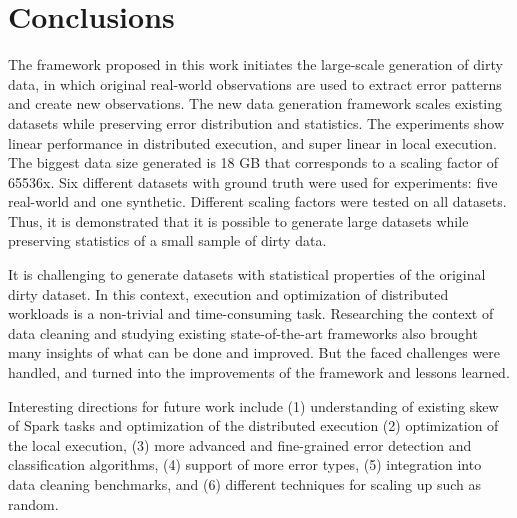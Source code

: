 \chapter{Conclusions}
The framework proposed in this work initiates the large-scale generation of dirty data, in which original real-world observations are used to extract error patterns and create new observations.
The new data generation framework scales existing datasets while preserving error distribution and statistics.
The experiments show linear performance in distributed execution, and super linear in local execution.
The biggest data size generated is 18 GB that corresponds to a scaling factor of 65536x.
Six different datasets with ground truth were used for experiments: five real-world and one synthetic.
Different scaling factors were tested on all datasets.
Thus, it is demonstrated that it is possible to generate large datasets while preserving statistics of a small sample of dirty data.

It is challenging to generate datasets with statistical properties of the original dirty dataset.
In this context, execution and optimization of distributed workloads is a non-trivial and time-consuming task.
Researching the context of data cleaning and studying existing state-of-the-art frameworks also brought many insights of what can be done and improved.
But the faced challenges were handled, and turned into the improvements of the framework and lessons learned.

Interesting directions for future work include 
(1) understanding of existing skew of Spark tasks and optimization of the distributed execution
(2) optimization of the local execution, 
(3) more advanced and fine-grained error detection and classification algorithms,
(4) support of more error types, 
(5) integration into data cleaning benchmarks, and
(6) different techniques for scaling up such as random.
 

